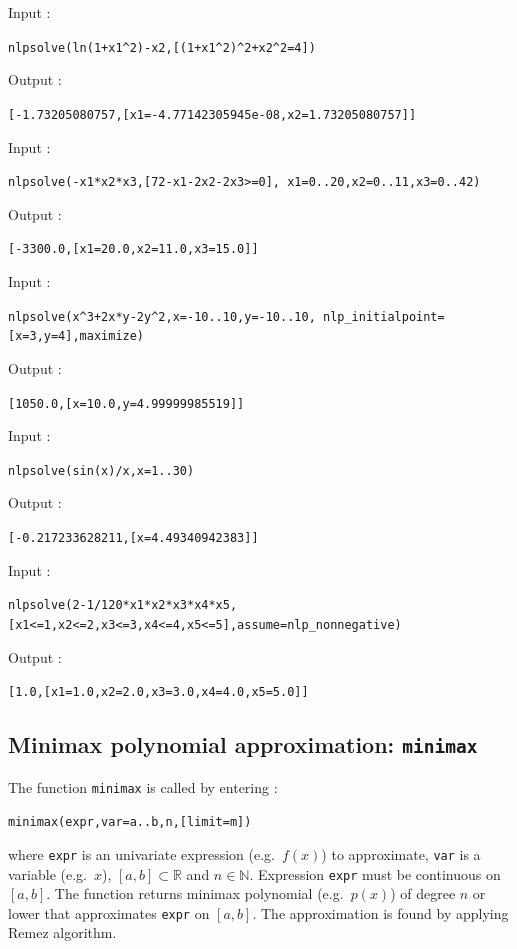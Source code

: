 \documentclass[a4paper,11pt]{book}
\begin{document}
Input :
\begin{center}
	\tt nlpsolve(ln(1+x1\^{}2)-x2,[(1+x1\^{}2)\^{}2+x2\^{}2=4])
\end{center}
Output :
\begin{center}
	\tt [-1.73205080757,[x1=-4.77142305945e-08,x2=1.73205080757]]
\end{center}
Input :
\begin{center}
	\tt nlpsolve(-x1*x2*x3,[72-x1-2x2-2x3>=0],
	x1=0..20,x2=0..11,x3=0..42)
\end{center}
Output :
\begin{center}
	\tt [-3300.0,[x1=20.0,x2=11.0,x3=15.0]]
\end{center}
Input :
\begin{center}
	\tt nlpsolve(x\^{}3+2x*y-2y\^{}2,x=-10..10,y=-10..10,
	nlp\_initialpoint=[x=3,y=4],maximize)
\end{center}
Output :
\begin{center}
	\tt [1050.0,[x=10.0,y=4.99999985519]]
\end{center}
Input :
\begin{center}
	\tt nlpsolve(sin(x)/x,x=1..30)
\end{center}
Output :
\begin{center}
	\tt [-0.217233628211,[x=4.49340942383]]
\end{center}
Input :
\begin{center}
	\tt nlpsolve(2-1/120*x1*x2*x3*x4*x5,
	[x1<=1,x2<=2,x3<=3,x4<=4,x5<=5],assume=nlp\_nonnegative)
\end{center}
Output :
\begin{center}
	\tt [1.0,[x1=1.0,x2=2.0,x3=3.0,x4=4.0,x5=5.0]]
\end{center}

\subsection{Minimax polynomial approximation: {\tt minimax}}

The function {\tt minimax} is called by entering :
\begin{center}
{\tt minimax(expr,var=a..b,n,[limit=m])}
\end{center}
where {\tt expr} is an univariate expression (e.g.~$ f(x) $) to approximate, {\tt var} is a variable (e.g.~$ x $), $ [a,b]\subset\mathbb{R} $ and $ n\in\mathbb{N} $. Expression {\tt expr} must be continuous on $ [a,b] $. The function returns minimax polynomial (e.g.~$ p(x) $) of degree $ n $ or lower that approximates {\tt expr} on $ [a,b] $. The approximation is found by applying Remez algorithm.
\end{document}
